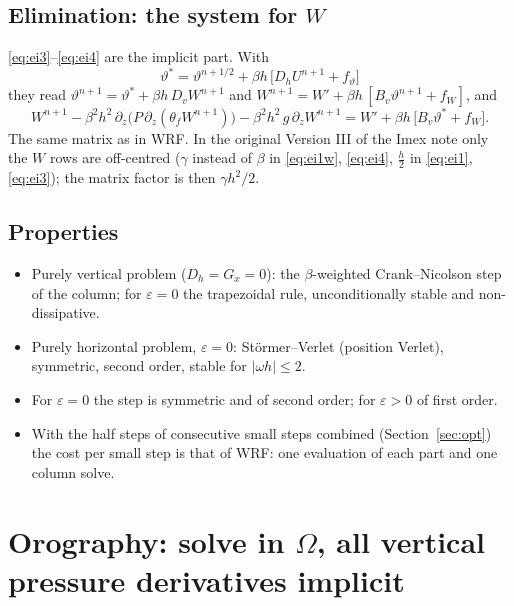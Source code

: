 \documentclass[11pt,a4paper]{article}
\newcommand{\tv}{\vartheta}   %
\begin{document}
\subsection{Elimination: the system for $W$}
\eqref{eq:ei3}--\eqref{eq:ei4} are the implicit part. With
\[
\tv^*=\tv^{n+1/2}+\beta h\,\big[D_hU^{n+1}+f_\tv\big]
\]
they read $\tv^{n+1}=\tv^*+\beta h\,D_vW^{n+1}$ and $W^{n+1}=W'+\beta h\,[B_v\tv^{n+1}+f_W]$, and
\[
W^{n+1}-\beta^2h^2\,\partial_z\big(P\,\partial_z(\theta_fW^{n+1})\big)-\beta^2h^2\,g\,\partial_zW^{n+1}=W'+\beta h\,\big[B_v\tv^*+f_W\big] .
\]
The same matrix as in WRF. In the original Version III of the Imex note only the $W$ rows are off-centred
($\gamma$ instead of $\beta$ in \eqref{eq:ei1w}, \eqref{eq:ei4}, $\tfrac h2$ in \eqref{eq:ei1}, \eqref{eq:ei3}); the matrix factor is then $\gamma h^2/2$.

\subsection{Properties}
\begin{itemize}
\item Purely vertical problem ($D_h=G_x=0$): the $\beta$-weighted Crank--Nicolson step of the column;
for $\varepsilon=0$ the trapezoidal rule, unconditionally stable and non-dissipative.
\item Purely horizontal problem, $\varepsilon=0$: Störmer--Verlet (position Verlet), symmetric, second order,
stable for $|\omega h|\le2$.
\item For $\varepsilon=0$ the step is symmetric and of second order; for $\varepsilon>0$ of first order.
\item With the half steps of consecutive small steps combined (Section~\ref{sec:opt}) the cost per small step
is that of WRF: one evaluation of each part and one column solve.
\end{itemize}

\section{Orography: solve in $\Omega$, all vertical pressure derivatives implicit}\label{sec:omega}
\end{document}
